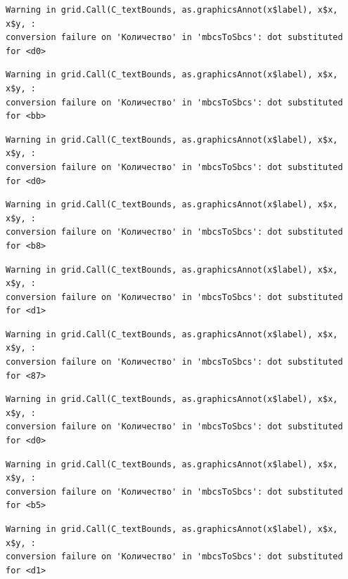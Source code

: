 \documentclass[
  letterpaper,
]{scrbook}
\theoremstyle{definition}
\theoremstyle{remark}
\begin{document}
\begin{verbatim}
Warning in grid.Call(C_textBounds, as.graphicsAnnot(x$label), x$x, x$y, :
conversion failure on 'Количество' in 'mbcsToSbcs': dot substituted for <d0>
\end{verbatim}

\begin{verbatim}
Warning in grid.Call(C_textBounds, as.graphicsAnnot(x$label), x$x, x$y, :
conversion failure on 'Количество' in 'mbcsToSbcs': dot substituted for <bb>
\end{verbatim}

\begin{verbatim}
Warning in grid.Call(C_textBounds, as.graphicsAnnot(x$label), x$x, x$y, :
conversion failure on 'Количество' in 'mbcsToSbcs': dot substituted for <d0>
\end{verbatim}

\begin{verbatim}
Warning in grid.Call(C_textBounds, as.graphicsAnnot(x$label), x$x, x$y, :
conversion failure on 'Количество' in 'mbcsToSbcs': dot substituted for <b8>
\end{verbatim}

\begin{verbatim}
Warning in grid.Call(C_textBounds, as.graphicsAnnot(x$label), x$x, x$y, :
conversion failure on 'Количество' in 'mbcsToSbcs': dot substituted for <d1>
\end{verbatim}

\begin{verbatim}
Warning in grid.Call(C_textBounds, as.graphicsAnnot(x$label), x$x, x$y, :
conversion failure on 'Количество' in 'mbcsToSbcs': dot substituted for <87>
\end{verbatim}

\begin{verbatim}
Warning in grid.Call(C_textBounds, as.graphicsAnnot(x$label), x$x, x$y, :
conversion failure on 'Количество' in 'mbcsToSbcs': dot substituted for <d0>
\end{verbatim}

\begin{verbatim}
Warning in grid.Call(C_textBounds, as.graphicsAnnot(x$label), x$x, x$y, :
conversion failure on 'Количество' in 'mbcsToSbcs': dot substituted for <b5>
\end{verbatim}

\begin{verbatim}
Warning in grid.Call(C_textBounds, as.graphicsAnnot(x$label), x$x, x$y, :
conversion failure on 'Количество' in 'mbcsToSbcs': dot substituted for <d1>
\end{verbatim}
\end{document}
